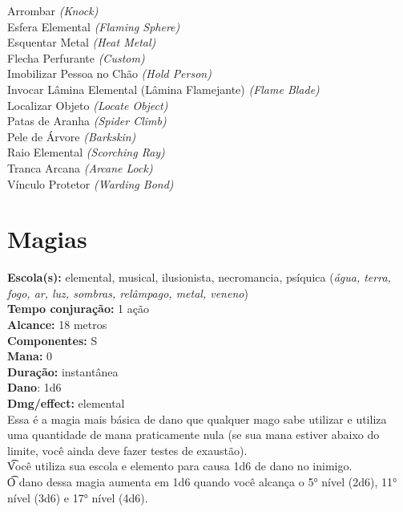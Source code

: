 \documentclass{RPG_Adventure}[2021/10/20]
\begin{document}
{\normalsize Arrombar \textit{(Knock)}\\ }
{\normalsize Esfera Elemental \textit{(Flaming Sphere)}\\ }
{\normalsize Esquentar Metal \textit{(Heat Metal)}\\ }
{\normalsize Flecha Perfurante \textit{(Custom)}\\ }
{\normalsize Imobilizar Pessoa no Chão \textit{(Hold Person)}\\ }
{\normalsize Invocar Lâmina Elemental (Lâmina Flamejante) \textit{(Flame Blade)}\\ }
{\normalsize Localizar Objeto \textit{(Locate Object)}\\ }
{\normalsize Patas de Aranha \textit{(Spider Climb)}\\ }
{\normalsize Pele de Árvore \textit{(Barkskin)}\\ }
{\normalsize Raio Elemental \textit{(Scorching Ray)}\\ }
{\normalsize Tranca Arcana \textit{(Arcane Lock)}\\ }
{\normalsize Vínculo Protetor \textit{(Warding Bond)}\\ }
\jump\chapter{Magias}\n\n{}
{\small \t \textbf{Escola(s):} elemental, musical, ilusionista, necromancia, psíquica (\textit{água, terra, fogo, ar, luz, sombras, relâmpago, metal, veneno})\\\t \textbf{Tempo conjuração:} 1 ação\\\t \textbf{Alcance:} 18 metros\\\t \textbf{Componentes:} S\\\t \textbf{Mana:} 0\\\t \textbf{Duração:} instantânea\\\t \textbf{Dano}: 1d6\\\t \textbf{Dmg/effect:} elemental\\}
{\normalsize Essa é a magia mais básica de dano que qualquer mago sabe utilizar e utiliza uma quantidade de mana praticamente nula (se sua mana estiver abaixo do limite, você ainda deve fazer testes de exaustão).\\\t Você utiliza sua escola e elemento para causa 1d6 de dano no inimigo.\\\t O dano dessa magia aumenta em 1d6 quando você alcança o 5° nível (2d6), 11° nível (3d6) e 17° nível (4d6).\\}
\end{document}
